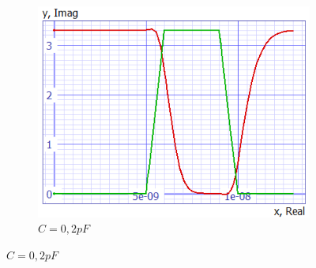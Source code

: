 \documentclass[../main.tex]{subfiles}
\begin{document}
{\begin{figure}[H]
\begin{subfigure}{0.3\textwidth}
				\centering
				\includegraphics[width=\textwidth]{plots/Q6_02pf.png}
				\caption{$C = 0,2pF$}
				\label{fig:subfig3}
			\end{subfigure}
			

\end{figure}}
\end{document}
